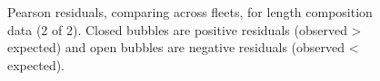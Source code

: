 \documentclass[
]{scrartcl}
\begin{document}
\begin{figure}


\caption{\label{fig-pearsonlenfit2}Pearson residuals, comparing across
fleets, for length composition data (2 of 2). Closed bubbles are
positive residuals (observed \textgreater{} expected) and open bubbles
are negative residuals (observed \textless{} expected).}

\end{figure}%
\end{document}
